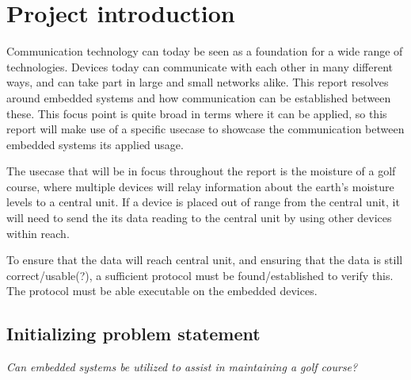 \chapter{Project introduction}
Communication technology can today be seen as a foundation for a wide range of technologies. Devices today can communicate with each other in many different ways, and can take part in large and small networks alike.
%
This report resolves around embedded systems and how communication can be established between these. This focus point is quite broad in terms where it can be applied, so this report will make use of a specific usecase to showcase the communication between embedded systems its applied usage.

The usecase that will be in focus throughout the report is the moisture of a golf course, where multiple devices will relay information about the earth's moisture levels to a central unit. If a device is placed out of range from the central unit, it will need to send the its data reading to the central unit by using other devices within reach.

To ensure that the data will reach central unit, and ensuring that the data is still correct/usable(?), a sufficient protocol must be found/established to verify this. The protocol must be able executable on the embedded devices.

\section{Initializing problem statement}

\textit{Can embedded systems be utilized to assist in maintaining a golf course?}


